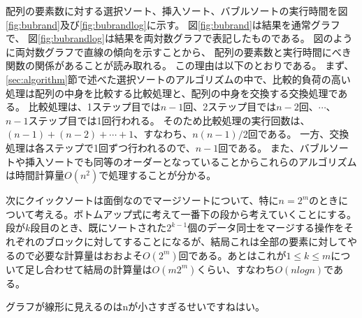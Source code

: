 \documentclass[dvipdfmx, a4paper, titlepage]{jsarticle}
\begin{document}
配列の要素数に対する選択ソート、挿入ソート、バブルソートの実行時間を図\ref{fig:bubrand}及び\ref{fig:bubrandlog}に示す。
図\ref{fig:bubrand}は結果を通常グラフで、
図\ref{fig:bubrandlog}は結果を両対数グラフで表記したものである。
図のように両対数グラフで直線の傾向を示すことから、
配列の要素数と実行時間にべき関数の関係があることが読み取れる。
この理由は以下のとおりである。
まず、\ref{sec:algorithm}節で述べた選択ソートのアルゴリズムの中で、比較的負荷の高い処理は配列の中身を比較する比較処理と、配列の中身を交換する交換処理である。
比較処理は、1ステップ目では$n-1$回、2ステップ目では$n-2$回、$\cdots$、$n-1$ステップ目では1回行われる。
そのため比較処理の実行回数は、$(n-1) + (n-2) + \cdots + 1$、すなわち、$n(n-1)/2$回である。
一方、交換処理は各ステップで1回ずつ行われるので、$n-1$回である。
また、バブルソートや挿入ソートでも同等のオーダーとなっていることからこれらのアルゴリズムは時間計算量$O(n^2)$で処理することが分かる。

次にクイックソートは面倒なのでマージソートについて、特に$n = 2^m$のときについて考える。ボトムアップ式に考えて一番下の段から考えていくことにする。段が$k$段目のとき、既にソートされた$2^{k-1}$個のデータ同士をマージする操作をそれぞれのブロックに対してすることになるが、結局これは全部の要素に対してやるので必要な計算量はおおよそ$O(2^m)$回である。あとはこれが$1 \leq k \leq m$について足し合わせて結局の計算量は$O(m2^m)$くらい、すなわち$O(nlogn)$である。

グラフが線形に見えるのはnが小さすぎるせいですねはい。

\begin{center}
  \label{fig:bubrand}
\end{center}
\end{document}
